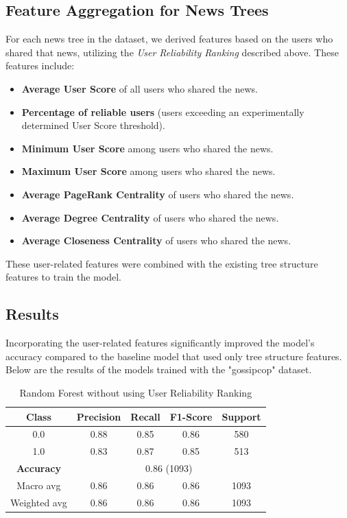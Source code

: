 \documentclass[11pt,a4paper]{article}
\begin{document}
\subsection*{Feature Aggregation for News Trees}
For each news tree in the dataset, we derived features based on the users who shared that news, utilizing the \textit{User Reliability Ranking} described above. These features include:
\begin{itemize}
    \item \textbf{Average User Score} of all users who shared the news.
    \item \textbf{Percentage of reliable users} (users exceeding an experimentally determined User Score threshold).
    \item \textbf{Minimum User Score} among users who shared the news.
    \item \textbf{Maximum User Score} among users who shared the news.
    \item \textbf{Average PageRank Centrality} of users who shared the news.
    \item \textbf{Average Degree Centrality} of users who shared the news.
    \item \textbf{Average Closeness Centrality} of users who shared the news.
\end{itemize}

These user-related features were combined with the existing tree structure features to train the model.

\subsection*{Results}
Incorporating the user-related features significantly improved the model's accuracy compared to the baseline model that used only tree structure features. Below are the results of the models trained with the "gossipcop" dataset.

\begin{table}[ht]
\centering
\begin{tabular}{|c|c|c|c|c|}
\hline
Class & Precision & Recall & F1-Score & Support \\
\hline
0.0    & 0.88      & 0.85   & 0.86     & 580     \\
1.0    & 0.83      & 0.87   & 0.85     & 513     \\
\hline
\textbf{Accuracy}   & \multicolumn{4}{c|}{0.86 (1093)} \\
\hline
Macro avg           & 0.86      & 0.86   & 0.86     & 1093    \\
Weighted avg        & 0.86      & 0.86   & 0.86     & 1093    \\
\hline
\end{tabular}
\caption{Random Forest without using User Reliability Ranking}
\end{table}
\end{document}
